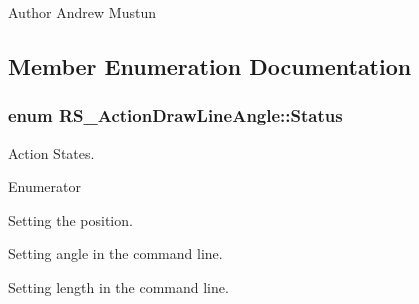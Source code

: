 \begin{DoxyAuthor}{Author}
Andrew Mustun 
\end{DoxyAuthor}


\subsection{Member Enumeration Documentation}
\hypertarget{classRS__ActionDrawLineAngle_a1824ce19ecc1ba7c0cb5e1dc78010f1c}{
\subsubsection[{Status}]{\setlength{\rightskip}{0pt plus 5cm}enum {\bf R\-S\-\_\-\-Action\-Draw\-Line\-Angle\-::\-Status}}}\label{classRS__ActionDrawLineAngle_a1824ce19ecc1ba7c0cb5e1dc78010f1c}
Action States. \begin{Desc}
\item[Enumerator]\par
\begin{description}
\item[{\em 
\hypertarget{classRS__ActionDrawLineAngle_a1824ce19ecc1ba7c0cb5e1dc78010f1ca11f9dd52f2c6b33a2bbc1f65e2ed85d4}{Set\-Pos}\label{classRS__ActionDrawLineAngle_a1824ce19ecc1ba7c0cb5e1dc78010f1ca11f9dd52f2c6b33a2bbc1f65e2ed85d4}
}]Setting the position. \item[{\em 
\hypertarget{classRS__ActionDrawLineAngle_a1824ce19ecc1ba7c0cb5e1dc78010f1ca7b20cd1ea0ace7e450ac7170271fd843}{Set\-Angle}\label{classRS__ActionDrawLineAngle_a1824ce19ecc1ba7c0cb5e1dc78010f1ca7b20cd1ea0ace7e450ac7170271fd843}
}]Setting angle in the command line. \item[{\em 
\hypertarget{classRS__ActionDrawLineAngle_a1824ce19ecc1ba7c0cb5e1dc78010f1caaee69513cb55ff56861de44d32ffb5c4}{Set\-Length}\label{classRS__ActionDrawLineAngle_a1824ce19ecc1ba7c0cb5e1dc78010f1caaee69513cb55ff56861de44d32ffb5c4}
}]Setting length in the command line. \end{description}
\end{Desc}


